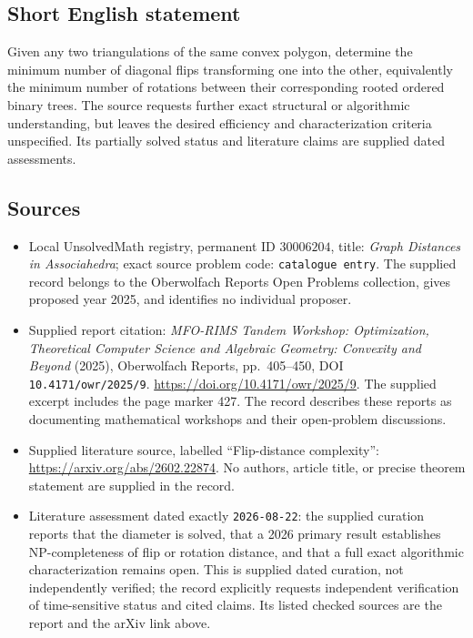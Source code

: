 \documentclass[11pt]{article}
\begin{document}
\subsection{Short English statement}
Given any two triangulations of the same convex polygon, determine the minimum number of diagonal flips transforming one into the other, equivalently the minimum number of rotations between their corresponding rooted ordered binary trees. The source requests further exact structural or algorithmic understanding, but leaves the desired efficiency and characterization criteria unspecified. Its partially solved status and literature claims are supplied dated assessments.
\subsection{Sources}
\begin{itemize}
\item Local UnsolvedMath registry, permanent ID \(30006204\), title: \emph{Graph Distances in Associahedra}; exact source problem code: \texttt{catalogue entry}. The supplied record belongs to the Oberwolfach Reports Open Problems collection, gives proposed year 2025, and identifies no individual proposer.
\item Supplied report citation: \emph{MFO-RIMS Tandem Workshop: Optimization, Theoretical Computer Science and Algebraic Geometry: Convexity and Beyond} (2025), Oberwolfach Reports, pp.\ 405--450, DOI \texttt{10.4171/owr/2025/9}. \url{https://doi.org/10.4171/owr/2025/9}. The supplied excerpt includes the page marker 427. The record describes these reports as documenting mathematical workshops and their open-problem discussions.
\item Supplied literature source, labelled ``Flip-distance complexity'': \url{https://arxiv.org/abs/2602.22874}. No authors, article title, or precise theorem statement are supplied in the record.
\item Literature assessment dated exactly \texttt{2026-08-22}: the supplied curation reports that the diameter is solved, that a 2026 primary result establishes NP-completeness of flip or rotation distance, and that a full exact algorithmic characterization remains open. This is supplied dated curation, not independently verified; the record explicitly requests independent verification of time-sensitive status and cited claims. Its listed checked sources are the report and the arXiv link above.
\end{itemize}
\end{document}
